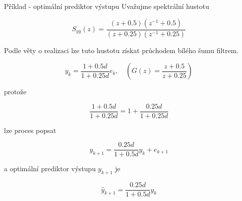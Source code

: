 \begin{note}{Příklad - optimální prediktor výstupu}
Uvažujme spektrální hustotu

\[ S_{yy}(z) = \frac{(z+0.5)(z^{-1}+0.5)}{(z+0.25)(z^{-1}+0.25)} \]

Podle věty o realizaci lze tuto hustotu získat průchodem bílého šumu filtrem.

\[ y_k = \frac{1+0.5d}{1+0.25d}e_k,\quad \left(G(z) = \frac{z+0.5}{z+0.25}\right) \]

protože

\[ \frac{1+0.5d}{1+0.25d} = 1+\frac{0.25d}{1+0.25d} \]

lze proces popsat

\[ y_{k+1} = \frac{0.25d}{1+0.5d}y_k+e_{k+1} \]

a optimální prediktor výstupu $y_{k+1}$ je

\[ \widehat{y}_{k+1} = \frac{0.25d}{1+0.5d}y_k \]

\end{note}